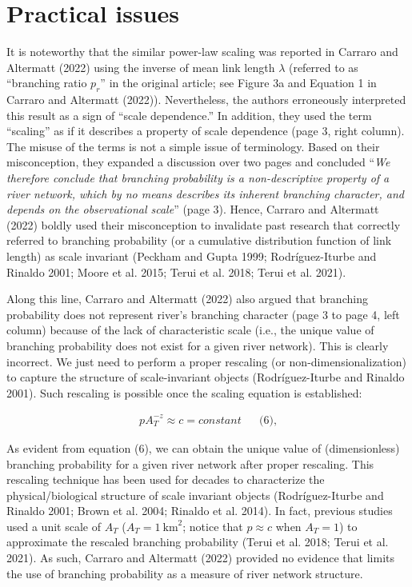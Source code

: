 \documentclass[
  12pt,
]{article}
\begin{document}
\hypertarget{practical-issues}{%
\section{Practical issues}\label{practical-issues}}

It is noteworthy that the similar power-law scaling was reported in Carraro and Altermatt (2022) using the inverse of mean link length \(\lambda\) (referred to as ``branching ratio \(p_r\)'' in the original article; see Figure 3a and Equation 1 in Carraro and Altermatt (2022)). Nevertheless, the authors erroneously interpreted this result as a sign of ``scale dependence.'' In addition, they used the term ``scaling'' as if it describes a property of scale dependence (page 3, right column). The misuse of the terms is not a simple issue of terminology. Based on their misconception, they expanded a discussion over two pages and concluded ``\emph{We therefore conclude that branching probability is a non-descriptive property of a river network, which by no means describes its inherent branching character, and depends on the observational scale}'' (page 3). Hence, Carraro and Altermatt (2022) boldly used their misconception to invalidate past research that correctly referred to branching probability (or a cumulative distribution function of link length) as scale invariant (Peckham and Gupta 1999; Rodríguez-Iturbe and Rinaldo 2001; Moore et al. 2015; Terui et al. 2018; Terui et al. 2021).

Along this line, Carraro and Altermatt (2022) also argued that branching probability does not represent river's branching character (page 3 to page 4, left column) because of the lack of characteristic scale (i.e., the unique value of branching probability does not exist for a given river network). This is clearly incorrect. We just need to perform a proper rescaling (or non-dimensionalization) to capture the structure of scale-invariant objects (Rodríguez-Iturbe and Rinaldo 2001). Such rescaling is possible once the scaling equation is established:

\[
\begin{aligned}
p A_T^{-z} \approx c = constant &&\text{(6),}
\end{aligned}
\]

As evident from equation (6), we can obtain the unique value of (dimensionless) branching probability for a given river network after proper rescaling. This rescaling technique has been used for decades to characterize the physical/biological structure of scale invariant objects (Rodríguez-Iturbe and Rinaldo 2001; Brown et al. 2004; Rinaldo et al. 2014). In fact, previous studies used a unit scale of \(A_T\) (\(A_T = 1~\text{km}^2\); notice that \(p \approx c\) when \(A_T = 1\)) to approximate the rescaled branching probability (Terui et al. 2018; Terui et al. 2021). As such, Carraro and Altermatt (2022) provided no evidence that limits the use of branching probability as a measure of river network structure.
\end{document}
